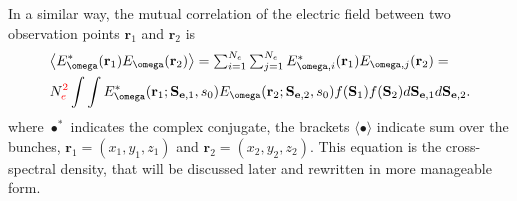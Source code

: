 \documentclass{iucr}              %
\newcommand{\inred}[1]{{\color{red}#1}}
\begin{document}
In a similar way, the mutual correlation of the electric field between two observation points $\textbf{r}_1$ and $\textbf{r}_2$ is
\begin{equation}\label{eq:CSDallaChubar}
\begin{split}
      &\big\langle E^*_{\omega}(\textbf{r}_1)  E_{\omega}(\textbf{r}_2)\big\rangle = 
      \sum_{i=1}^{N_e} \sum_{j=1}^{N_e} E^*_{\omega,i}(\textbf{r}_1) E_{\omega,j}(\textbf{r}_2) = \\
      & N_e^\inred{2}\int \int 
      E^*_{\omega}(\textbf{r}_1;\textbf{S}_{\textbf{e},1},s_0)
      E_{\omega}(\textbf{r}_2;\textbf{S}_{\textbf{e},2},s_0)
      f(\textbf{S}_1) f(\textbf{S}_2)
      d\textbf{S}_{\textbf{e},1} d\textbf{S}_{\textbf{e},2}.
\end{split}
\end{equation}
where $\bullet^*$ indicates the complex conjugate, the brackets $\langle \bullet \rangle$ indicate sum over the bunches, $\textbf{r}_1=(x_1,y_1,z_1)$ and $\textbf{r}_2=(x_2,y_2,z_2)$. This equation is the cross-spectral density, that will be discussed later and rewritten in more manageable form. 






\end{document}
